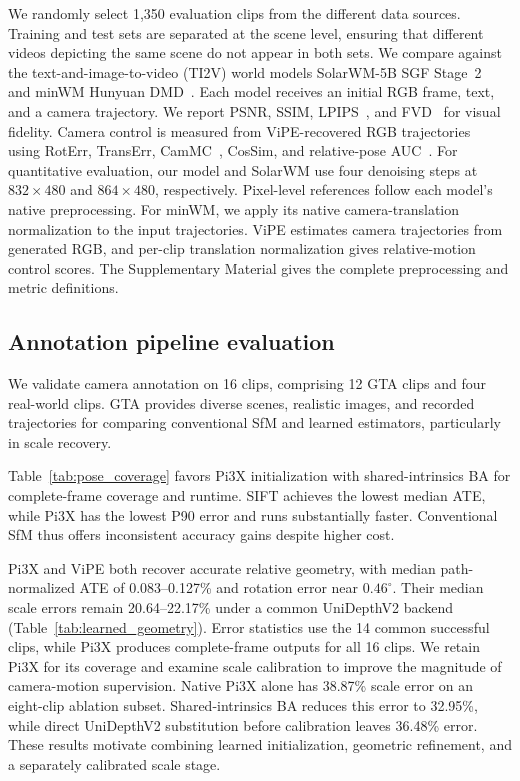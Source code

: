 We randomly select 1,350 evaluation clips from the different data sources.
Training and test sets are separated at the scene level, ensuring that different videos depicting the same scene do not appear in both sets.
We compare against the text-and-image-to-video (TI2V) world models SolarWM-5B SGF Stage~2~\cite{huang2026solarwmopendatascalable} and minWM Hunyuan DMD~\cite{zhao2026minwmfullstackopensourceframework}.
Each model receives an initial RGB frame, text, and a camera trajectory.
We report PSNR, SSIM, LPIPS~\cite{zhang2018lpips}, and FVD~\cite{unterthiner2018fvd} for visual fidelity.
Camera control is measured from ViPE-recovered RGB trajectories~\cite{huang2025vipevideoposeengine} using RotErr, TransErr, CamMC~\cite{yin2026scope}, CosSim, and relative-pose AUC~\cite{wang2025vggt}.
For quantitative evaluation, our model and SolarWM use four denoising steps at $832\!\times\!480$ and $864\!\times\!480$, respectively.
Pixel-level references follow each model's native preprocessing.
For minWM, we apply its native camera-translation normalization to the input trajectories.
ViPE estimates camera trajectories from generated RGB, and per-clip translation normalization gives relative-motion control scores.
The Supplementary Material gives the complete preprocessing and metric definitions.

\subsection{Annotation pipeline evaluation}
\label{sec:annotation_evaluation}

We validate camera annotation on 16 clips, comprising 12 GTA clips and four real-world clips.
GTA provides diverse scenes, realistic images, and recorded trajectories for comparing conventional SfM and learned estimators, particularly in scale recovery.

Table~\ref{tab:pose_coverage} favors Pi3X initialization with shared-intrinsics BA for complete-frame coverage and runtime.
SIFT achieves the lowest median ATE, while Pi3X has the lowest P90 error and runs substantially faster.
Conventional SfM thus offers inconsistent accuracy gains despite higher cost.

Pi3X and ViPE both recover accurate relative geometry, with median path-normalized ATE of 0.083--0.127\% and rotation error near $0.46^\circ$.
Their median scale errors remain 20.64--22.17\% under a common UniDepthV2 backend (Table~\ref{tab:learned_geometry}).
Error statistics use the 14 common successful clips, while Pi3X produces complete-frame outputs for all 16 clips.
We retain Pi3X for its coverage and examine scale calibration to improve the magnitude of camera-motion supervision.
Native Pi3X alone has 38.87\% scale error on an eight-clip ablation subset.
Shared-intrinsics BA reduces this error to 32.95\%, while direct UniDepthV2 substitution before calibration leaves 36.48\% error.
These results motivate combining learned initialization, geometric refinement, and a separately calibrated scale stage.

